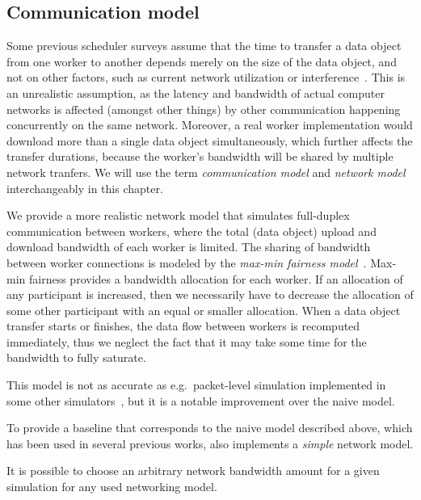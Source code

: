 \subsection{Communication model}
Some previous scheduler surveys assume that the time to transfer a data object from one worker to
another depends merely on the size of the data object, and not on other factors, such as current
network utilization or interference~\cite{tang2010list,yao2013task,wang2018list,kwok1996dynamic}. This is an unrealistic assumption, as
the latency and bandwidth of actual computer networks is affected (amongst other things) by other
communication happening concurrently on the same network. Moreover, a real worker implementation
would download more than a single data object simultaneously, which further affects the transfer
durations, because the worker's bandwidth will be shared by multiple network tranfers. We will use
the term \emph{communication model} and \emph{network model} interchangeably in this chapter.

We provide a more realistic network model that simulates full-duplex communication between workers,
where the total (data object) upload and download bandwidth of each worker is limited. The sharing
of bandwidth between worker connections is modeled by the
\emph{max-min fairness model}~\cite{bertsekas_1992}. Max-min fairness provides a bandwidth allocation
for each worker. If an allocation of any participant is increased, then we necessarily have to
decrease the allocation of some other participant with an equal or smaller allocation. When a data
object transfer starts or finishes, the data flow between workers is recomputed immediately, thus
we neglect the fact that it may take some time for the bandwidth to fully saturate.

This model is not as accurate as e.g.\ packet-level simulation implemented in some other
simulators~\cite{simgrid}, but it is a notable improvement over the naive model.

To provide a baseline that corresponds to the naive model described above, which has been used in
several previous works, \estee{} also implements a \emph{simple} network
model.

It is possible to choose an arbitrary network bandwidth amount for a given simulation for any used
networking model.


